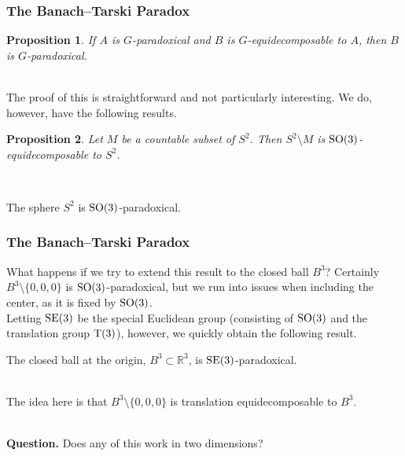 \documentclass{beamer}
\newtheorem{proposition}{Proposition}
\theoremstyle{example}
\begin{document}
\begin{frame}
\frametitle{The Banach--Tarski Paradox}
\begin{proposition}
If $A$ is $G$-paradoxical and $B$ is $G$-equidecomposable to $A$, then $B$ is $G$-paradoxical.
\end{proposition}
\noindent\\[0.5\baselineskip] The proof of this is straightforward and not particularly interesting. We do, however, have the following results.\\[0.5\baselineskip]
\begin{proposition}
Let $M$ be a countable subset of $S^2$. Then $S^2\setminus M$ is $\textup{SO}(3)$-equidecomposable to $S^2$.
\end{proposition}
\noindent\\[0.5\baselineskip]
\begin{corollary}
The sphere $S^2$ is $\textup{SO}(3)$-paradoxical.
\end{corollary}
\end{frame}

\begin{frame}
\frametitle{The Banach--Tarski Paradox}
What happens if we try to extend this result to the closed ball $B^3$? Certainly $B^3\setminus\{0, 0, 0\}$ is $\textup{SO}(3)$-paradoxical, but we run into issues when including the center, as it is fixed by $\textup{SO}(3)$.\\[0.5\baselineskip] %

Letting $\textup{SE}(3)$ be the special Euclidean group (consisting of $\textup{SO}(3)$ and the translation group $\textup{T}(3)$), however, we quickly obtain the following result.\\[0.5\baselineskip]
\begin{theorem}
The closed ball at the origin, $B^3 \subset \mathbb{R}^3$, is $\textup{SE}(3)$-paradoxical.
\end{theorem}
\noindent\\[0.5\baselineskip] The idea here is that $B^3\setminus\{0, 0, 0\}$ is translation equidecomposable to $B^3$.

\noindent\\[0.5\baselineskip] \textbf{Question.} Does any of this work in two dimensions?
\end{frame}

\end{document}
